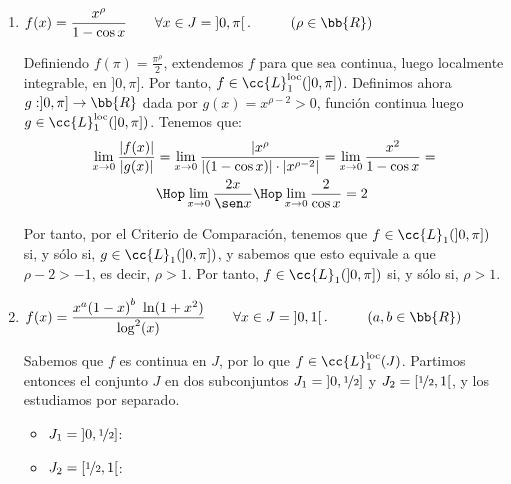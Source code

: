 \begin{ejercicio}
\begin{enumerate}
        Por tanto, $f\in \cc{L}_1(J)$ en todo caso, independientemente del valor de $n\in \bb{N}$.

        \item $f(x)=\dfrac{x^\rho}{1-\cos x} \qquad \forall x\in J=\left]0,\pi\right[.\hspace{1cm}(\rho\in \bb{R})$
        
        Definiendo $f(\pi) = \frac{\pi^\rho}{2}$, extendemos $f$ para que sea continua,
        luego localmente integrable, en $]0,\pi]$. Por tanto, $f\in \cc{L}_1^{\text{loc}}(]0,\pi])$.
        Definimos ahora $g:]0,\pi]\to \bb{R}$ dada por $g(x)=x^{\rho-2}>0$, función continua luego $g\in \cc{L}_1^{\text{loc}}(]0,\pi])$.
        Tenemos que:
        \begin{align*}
            \lim_{x\to 0} \dfrac{|f(x)|}{|g(x)|}
            &= \lim_{x\to 0} \dfrac{|x^\rho}{|(1-\cos x)|\cdot |x^{\rho-2}|}
            = \lim_{x\to 0} \dfrac{x^2}{1-\cos x}
            =\\& \Hop \lim_{x\to 0} \dfrac{2x}{\sen x}
            \Hop \lim_{x\to 0} \dfrac{2}{\cos x} = 2
        \end{align*}

        Por tanto, por el Criterio de Comparación, tenemos que $f\in \cc{L}_1(]0,\pi])$ si, y sólo si, $g\in \cc{L}_1(]0,\pi])$, y sabemos que esto equivale a que $\rho-2>-1$, es decir, $\rho>1$.
        Por tanto, $f\in \cc{L}_1(]0,\pi])$ si, y sólo si, $\rho>1$.

        \item $f(x)=\dfrac{x^a{(1-x)}^b~\ln(1+x^2)}{\log^2(x)} \qquad \forall x\in J=\left]0,1\right[.\hspace{1cm}(a,b\in \bb{R})$
        
        Sabemos que $f$ es continua en $J$, por lo que $f\in \cc{L}_1^{\text{loc}}(J)$.
        Partimos entonces el conjunto $J$ en dos subconjuntos $J_1=\left]0,\nicefrac{1}{2}\right]$ y $J_2=\left[\nicefrac{1}{2},1\right[$, y los estudiamos por separado.
        \begin{itemize}
            \item \ul{$J_1=\left]0,\nicefrac{1}{2}\right]$}:
            \item \ul{$J_2=\left[\nicefrac{1}{2}, 1\right[$}:
        \end{itemize}

    \end{enumerate}
\end{ejercicio}



